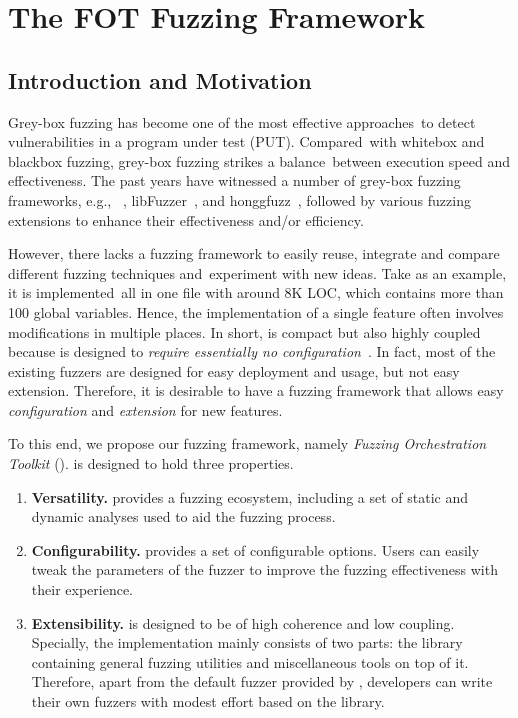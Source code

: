 
\chapter{The FOT Fuzzing Framework} \label{ch:fot}


\section{Introduction and Motivation}

Grey-box fuzzing has become one of the most effective approaches~to detect vulnerabilities in a program under test (PUT).
Compared~with whitebox and blackbox fuzzing, grey-box fuzzing strikes a balance~between execution speed and effectiveness.
The past years have witnessed a number of grey-box fuzzing frameworks, e.g., {\AFL}~\cite{afl}, libFuzzer~\cite{libfuzzer}, and honggfuzz~\cite{honggfuzz}, followed by  various fuzzing extensions \cite{Bohme:2016:CGF,LiCMLLT17,Bohme:2017:DGF,CollAFL,nezha} to enhance their effectiveness and/or efficiency.


However, there lacks a fuzzing framework to easily reuse, integrate and compare different fuzzing techniques and~experiment with new ideas.
Take {\AFL} as an example, it is implemented~all in one file with around 8K LOC, which contains more than 100 global variables.
Hence, the implementation of a single feature often involves modifications in multiple places.
In short, {\AFL} is compact but also highly coupled because {\AFL} is designed to \textit{require essentially no configuration}~\cite{afl}.
In fact, most of the existing fuzzers are designed for easy deployment and usage, but not easy extension.
Therefore, it is desirable to have a fuzzing framework that allows easy \emph{configuration} and \emph{extension} for new features.


To this end, we propose our fuzzing framework, namely \emph{Fuzzing Orchestration Toolkit}  ({\FOT}). {\FOT} is designed to hold three properties.

\begin{enumerate}[(1)]


\item  \textbf{Versatility.}
{\FOT} provides a fuzzing ecosystem, including a set of static and dynamic analyses used to aid the fuzzing process.


\item \textbf{Configurability.}
{\FOT} provides a set of configurable options.
Users can easily tweak the parameters of the fuzzer to improve the fuzzing effectiveness with their experience.

\item \textbf{Extensibility.}
{\FOT} is designed to be of high coherence and low coupling. Specially, the implementation mainly consists of two parts: the library containing general fuzzing utilities and miscellaneous tools on top of it. Therefore, apart from the default fuzzer provided by {\FOT}, developers can write their own fuzzers with modest effort based on the library.
\end{enumerate}


